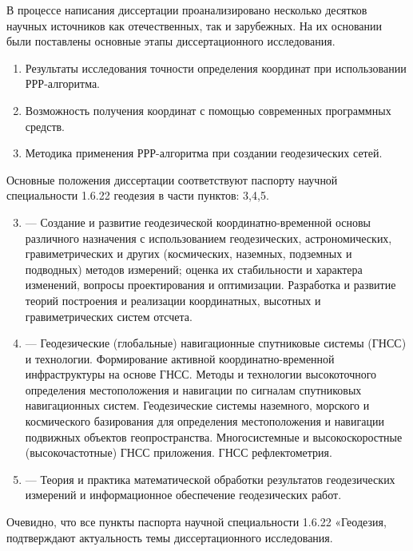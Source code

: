 {\methods}

В процессе написания диссертации проанализировано несколько десятков научных источников как отечественных, так и зарубежных. На их основании были поставлены основные этапы диссертационного исследования.

{}
\begin{enumerate}[beginpenalty=10000] %
	\item Результаты исследования точности определения координат при использовании РРР-алгоритма.
	\item Возможность получения координат с помощью современных программных средств.
	\item Методика применения РРР-алгоритма при создании геодезических сетей.
\end{enumerate}

{\pasport}
Основные положения диссертации соответствуют паспорту научной специальности 1.6.22 геодезия в части пунктов: 3,4,5.

\begin{enumerate}
	\setcounter{enumi}{2}
	\item --- Создание и развитие геодезической координатно-временной основы различного назначения с использованием геодезических, астрономических, гравиметрических и других (космических, наземных, подземных и подводных) методов измерений; оценка их стабильности и характера изменений, вопросы проектирования и оптимизации. Разработка и развитие теорий построения и реализации координатных, высотных и гравиметрических систем отсчета.
	\item --- Геодезические (глобальные) навигационные спутниковые системы (ГНСС) и технологии. Формирование активной координатно-временной инфраструктуры на основе ГНСС. Методы и технологии высокоточного определения местоположения и навигации по сигналам спутниковых навигационных систем. Геодезические системы наземного, морского и космического базирования для определения местоположения и навигации подвижных объектов геопространства. Многосистемные и высокоскоростные (высокочастотные) ГНСС приложения. ГНСС рефлектометрия.
	\item --- Теория и практика математической обработки результатов геодезических измерений и информационное обеспечение геодезических работ.
\end{enumerate}

Очевидно, что все пункты паспорта научной специальности 1.6.22 «Геодезия, подтверждают актуальность темы диссертационного исследования.

